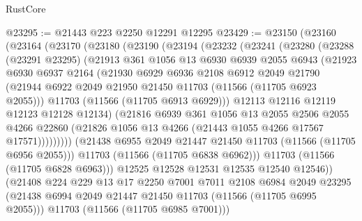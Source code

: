 \begin{lexlean}{RustCore}
\begin{coremodule}
@23295 := @21443 @223 @2250 @12291 @12295
@23429 := @23150
    (@23160
      (@23164
        (@23170
          (@23180
            (@23190
              (@23194
                (@23232
                  (@23241
                    (@23280
                      (@23288
                        (@23291 @23295)
                        (@21913
                          @361
                          @1056
                          @13
                          @6930
                          @6939
                          @2055
                          @6943
                          (@21923
                            @6930
                            @6937
                            @2164
                            (@21930
                              @6929
                              @6936
                              @2108
                              @6912
                              @2049
                              @21790
                              (@21944
                                @6922
                                @2049
                                @21950
                                @21450
                                @11703
                                (@11566 (@11705 @6923 @2055)))
                              @11703
                              (@11566 (@11705 @6913 @6929)))
                            @12113
                            @12116
                            @12119
                            @12123
                            @12128
                            @12134)
                          (@21816
                            @6939
                            @361
                            @1056
                            @13
                            @2055
                            @2506
                            @2055
                            @4266
                            @22860
                            (@21826 @1056 @13 @4266 (@21443 @1055 @4266 @17567 @17571)))))))))
              (@21438 @6955 @2049 @21447 @21450 @11703 (@11566 (@11705 @6956 @2055)))
              @11703
              (@11566 (@11705 @6838 @6962)))
            @11703
            (@11566 (@11705 @6828 @6963)))
          @12525
          @12528
          @12531
          @12535
          @12540
          @12546))
      (@21408
        @224
        @229
        @13
        @17
        @2250
        @7001
        @7011
        @2108
        @6984
        @2049
        @23295
        (@21438 @6994 @2049 @21447 @21450 @11703 (@11566 (@11705 @6995 @2055)))
        @11703
        (@11566 (@11705 @6985 @7001)))

\end{coremodule}
\end{lexlean}
